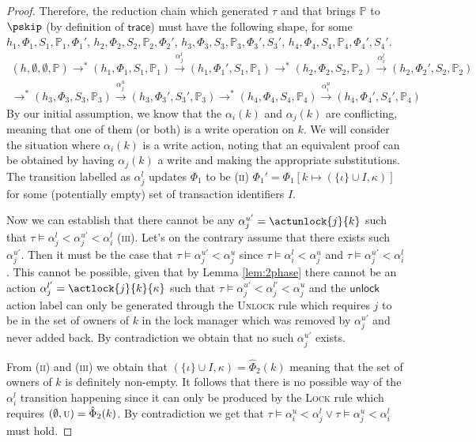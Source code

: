 \begin{proof}
Therefore, the reduction chain which generated $\tau$ and that brings $\mathds{P}$ to $\pskip$ (by definition of $\mathsf{trace}$) must have the following shape, for some $h_1, \Phi_1, S_1, \mathds{P}_1, \Phi_1'$, $h_2, \Phi_2, S_2, \mathds{P}_2, \Phi_2'$, $h_3, \Phi_3, S_3, \mathds{P}_3, \Phi_3', S_3'$, $h_4, \Phi_4, S_4, \mathds{P}_4, \Phi_4', S_4'$.
\begin{gather*}
(h, \emptyset, \emptyset, \mathds{P}) \rightarrow^* (h_1, \Phi_1, S_1, \mathds{P}_1) \xrightarrow{\alpha_j^l} (h_1, \Phi_1', S_1, \mathds{P}_1) \rightarrow^* (h_2, \Phi_2, S_2, \mathds{P}_2) \xrightarrow{\alpha_i^l} (h_2, \Phi_2', S_2, \mathds{P}_2)
\\
\rightarrow^* (h_3, \Phi_3, S_3, \mathds{P}_3) \xrightarrow{\alpha_j^u} (h_3, \Phi_3', S_3', \mathds{P}_3) \rightarrow^* (h_4, \Phi_4, S_4, \mathds{P}_4) \xrightarrow{\alpha_i^u} (h_4, \Phi_4', S_4', \mathds{P}_4)
\end{gather*}
By our initial assumption, we know that the $\alpha_i(k)$ and $\alpha_j(k)$ are conflicting, meaning that one of them (or both) is a write operation on $k$. We will consider the situation where $\alpha_i(k)$ is a write action, noting that an equivalent proof can be obtained by having $\alpha_j(k)$ a write and making the appropriate substitutions. The transition labelled as $\alpha_j^l$ updates $\Phi_1$ to be (\textsc{ii}) $\Phi_1' = \Phi_1[k \mapsto (\{\iota\} \cup I, \kappa)]$ for some (potentially empty) set of transaction identifiers $I$.

Now we can establish that there cannot be any $\alpha_j^{u'} = \actunlock{j}{k}$ such that $\tau \vDash \alpha_j^l < \alpha_j^{u'} < \alpha_i^l$ (\textsc{iii}). Let's on the contrary assume that there exists such $\alpha_j^{u'}$. Then it must be the case that $\tau \vDash \alpha_j^{u'} < \alpha_j^{u}$ since $\tau \vDash \alpha_i^l < \alpha_j^u$ and $\tau \vDash \alpha_j^{u'} < \alpha_i^l$. This cannot be possible, given that by Lemma \ref{lem:2phase} there cannot be an action $\alpha_j^{l'} = \actlock{j}{k}{\kappa}$ such that $\tau \vDash \alpha_j^{u'} < \alpha_j^{l'} < \alpha_j^{u}$ and the $\mathsf{unlock}$ action label can only be generated through the \textsc{Unlock} rule which requires $j$ to be in the set of owners of $k$ in the lock manager which was removed by $\alpha_j^{u'}$ and never added back. By contradiction we obtain that no such $\alpha_j^{u'}$ exists.

From (\textsc{ii}) and (\textsc{iii}) we obtain that $(\{\iota\} \cup I, \kappa) = \hat{\Phi}_2(k)$ meaning that the set of owners of $k$ is definitely non-empty. It follows that there is no possible way of the $\alpha_i^l$ transition happening since it can only be produced by the \textsc{Lock} rule which requires $(\emptyset, \textsc{u}) = \hat{\Phi}_2(k)$. By contradiction we get that $\tau \vDash \alpha_i^u < \alpha_j^l  \lor \tau \vDash \alpha_j^u < \alpha_i^l$ must hold.
\end{proof}

